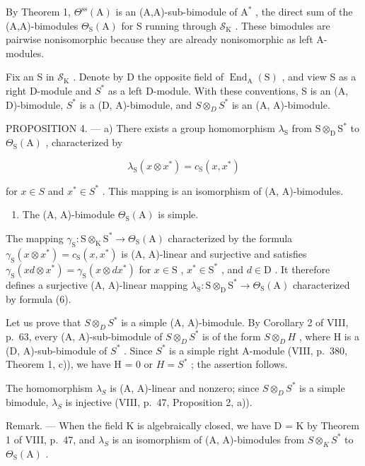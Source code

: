 By Theorem 1, \(\Theta^{\mathrm{ss}}(\mathrm{A})\) is an (A,A)-sub-bimodule of \(\mathrm{A}^*\) , the direct sum of the (A,A)-bimodules \(\Theta_{\mathrm{S}}(\mathrm{A})\) for S running through \(\mathcal{S}_{\mathrm{K}}\) . These bimodules are pairwise nonisomorphic because they are already nonisomorphic as left A-modules.

Fix an S in \(\mathcal{S}_{\mathrm{K}}\) . Denote by D the opposite field of \(\operatorname{End}_{\mathrm{A}}(\mathrm{S})\) , and view S as a right D-module and \(S^{*}\) as a left D-module. With these conventions, S is an (A, D)-bimodule, \(S^{*}\) is a (D, A)-bimodule, and \(S \otimes_{D} S^{*}\) is an (A, A)-bimodule.

PROPOSITION 4. --- a) There exists a group homomorphism \(\lambda_{\mathrm{S}}\) from \(\mathrm{S} \otimes_{\mathrm{D}} \mathrm{S}^{*}\) to \(\Theta_{\mathrm{S}}(\mathrm{A})\) , characterized by

\[
\lambda_ {\mathrm{S}} (x \otimes x ^ {*}) = c _ {\mathrm{S}} (x, x ^ {*})\tag{6}
\]

for \(x \in S\) and \(x^{*} \in S^{*}\) . This mapping is an isomorphism of (A, A)-bimodules.

\begin{enumerate}
\def\labelenumi{\alph{enumi})}
\setcounter{enumi}{1}
\tightlist
\item
  The (A, A)-bimodule \(\Theta_{\mathrm{S}}(\mathrm{A})\) is simple.
\end{enumerate}

The mapping \(\gamma_{\mathrm{S}}: \mathrm{S} \otimes_{\mathrm{K}} \mathrm{S}^{*} \to \Theta_{\mathrm{S}}(\mathrm{A})\) characterized by the formula \(\gamma_{\mathrm{S}}(x \otimes x^{*}) = c_{\mathrm{S}}(x, x^{*})\) is (A, A)-linear and surjective and satisfies \(\gamma_{\mathrm{S}}(xd \otimes x^{*}) = \gamma_{\mathrm{S}}(x \otimes dx^{*})\) for \(x \in \mathrm{S}\) , \(x^{*} \in \mathrm{S}^{*}\) , and \(d \in \mathrm{D}\) . It therefore defines a surjective (A, A)-linear mapping \(\lambda_{\mathrm{S}}: \mathrm{S} \otimes_{\mathrm{D}} \mathrm{S}^{*} \to \Theta_{\mathrm{S}}(\mathrm{A})\) characterized by formula (6).

Let us prove that \(S \otimes_{D} S^{*}\) is a simple (A, A)-bimodule. By Corollary 2 of VIII, p.~63, every (A, A)-sub-bimodule of \(S \otimes_{D} S^{*}\) is of the form \(S \otimes_{D} H\) , where H is a (D, A)-sub-bimodule of \(S^{*}\) . Since \(S^{*}\) is a simple right A-module (VIII, p.~380, Theorem 1, c)), we have H = 0 or \(H = S^{*}\) ; the assertion follows.

The homomorphism \(\lambda_{S}\) is (A, A)-linear and nonzero; since \(S \otimes_{D} S^{*}\) is a simple bimodule, \(\lambda_{S}\) is injective (VIII, p.~47, Proposition 2, a)).

Remark. --- When the field K is algebraically closed, we have D = K by Theorem 1 of VIII, p.~47, and \(\lambda_{S}\) is an isomorphism of (A, A)-bimodules from \(S \otimes_{K} S^{*}\) to \(\Theta_{\mathrm{S}}(\mathrm{A})\) .
\relax{}
